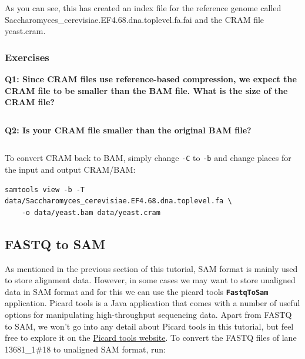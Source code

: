 \documentclass[11pt]{article}
\makeatletter
\newcommand{\boxspacing}{\kern\kvtcb@left@rule\kern\kvtcb@boxsep}
\newcommand{\prompt}[4]{
        \ttfamily\llap{{\color{#2}\LARGE\faKeyboardO\hspace{3pt}#4}}\vspace{-\baselineskip}
    }
\makeatother
\begin{document}
    As you can see, this has created an index file for the reference genome
called Saccharomyces\_cerevisiae.EF4.68.dna.toplevel.fa.fai and the CRAM
file yeast.cram.

    \hypertarget{exercises}{%
\subsubsection{Exercises}\label{exercises}}

\textbf{Q1: Since CRAM files use reference-based compression, we expect
the CRAM file to be smaller than the BAM file. What is the size of the
CRAM file?}

    \begin{tcolorbox}[breakable, size=fbox, boxrule=1pt, pad at break*=1mm,colback=cellbackground, colframe=cellborder]
\prompt{In}{incolor}{ }{\boxspacing}
\begin{Verbatim}[commandchars=\\\{\}]

\end{Verbatim}
\end{tcolorbox}

    \textbf{Q2: Is your CRAM file smaller than the original BAM file?}

    \begin{tcolorbox}[breakable, size=fbox, boxrule=1pt, pad at break*=1mm,colback=cellbackground, colframe=cellborder]
\prompt{In}{incolor}{ }{\boxspacing}
\begin{Verbatim}[commandchars=\\\{\}]

\end{Verbatim}
\end{tcolorbox}

    To convert CRAM back to BAM, simply change \texttt{-C} to \texttt{-b}
and change places for the input and output CRAM/BAM:

\begin{verbatim}
samtools view -b -T data/Saccharomyces_cerevisiae.EF4.68.dna.toplevel.fa \
    -o data/yeast.bam data/yeast.cram
\end{verbatim}

    \hypertarget{fastq-to-sam}{%
\subsection{FASTQ to SAM}\label{fastq-to-sam}}

As mentioned in the previous section of this tutorial, SAM format is
mainly used to store alignment data. However, in some cases we may want
to store unaligned data in SAM format and for this we can use the picard
tools \textbf{\texttt{FastqToSam}} application. Picard tools is a Java
application that comes with a number of useful options for manipulating
high-throughput sequencing data. Apart from FASTQ to SAM, we won't go
into any detail about Picard tools in this tutorial, but feel free to
explore it on the \href{https://broadinstitute.github.io/picard/}{Picard
tools website}. To convert the FASTQ files of lane 13681\_1\#18 to
unaligned SAM format, run:
\end{document}
